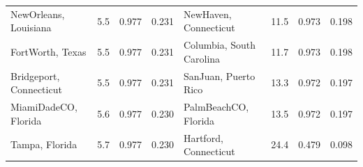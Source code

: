 \begin{table}[!htb]
\begin{tabular}{lrrr@{\hspace{1.2em}}lrrr}
  NewOrleans, Louisiana & 5.5 & 0.977 & 0.231 & NewHaven, Connecticut & 11.5 & 0.973 & 0.198 \\
  FortWorth, Texas & 5.5 & 0.977 & 0.231 & Columbia, South Carolina & 11.7 & 0.973 & 0.198 \\
  Bridgeport, Connecticut & 5.5 & 0.977 & 0.231 & SanJuan, Puerto Rico & 13.3 & 0.972 & 0.197 \\
  MiamiDadeCO, Florida & 5.6 & 0.977 & 0.230 & PalmBeachCO, Florida & 13.5 & 0.972 & 0.197 \\
  Tampa, Florida & 5.7 & 0.977 & 0.230 & Hartford, Connecticut & 24.4 & 0.479 & 0.098 \\
\bottomrule
\end{tabular}
\end{table}
